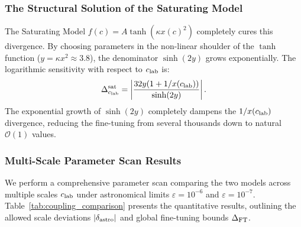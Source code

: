 \documentclass[11pt,a4paper]{article}
\theoremstyle{definition}
\begin{document}
	\subsubsection{The Structural Solution of the Saturating Model}
	The Saturating Model $f(c) = A \tanh(\kappa x(c)^2)$ completely cures this divergence. By choosing parameters in the non-linear shoulder of the $\tanh$ function ($y = \kappa x^2 \approx 3.8$), the denominator $\sinh(2y)$ grows exponentially. The logarithmic sensitivity with respect to $c_{\rm lab}$ is:
	\begin{equation}
		\Delta_{c_{\rm lab}}^{\rm sat} = \left| \frac{32 y (1 + 1/x(c_{\rm lab}))}{\sinh(2y)} \right|.
	\end{equation}
	The exponential growth of $\sinh(2y)$ completely dampens the $1/x(c_{\rm lab})$ divergence, reducing the fine-tuning from several thousands down to natural $\mathcal{O}(1)$ values.
	
	\subsubsection{Multi-Scale Parameter Scan Results}
	We perform a comprehensive parameter scan comparing the two models across multiple scales $c_{\rm lab}$ under astronomical limits $\varepsilon = 10^{-6}$ and $\varepsilon = 10^{-7}$. Table~\ref{tab:coupling_comparison} presents the quantitative results, outlining the allowed scale deviations $|\delta_{\rm astro}|$ and global fine-tuning bounds $\Delta_{\rm FT}$.
	
\end{document}
